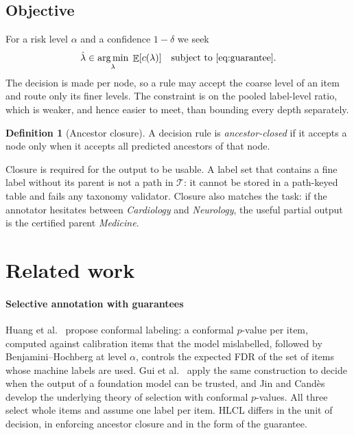 \documentclass[preprint,12pt]{elsarticle}
\theoremstyle{definition}
\newtheorem{definition}{Definition}
\theoremstyle{remark}
\newcommand{\hlcl}{\textup{\textsc{HLCL}}}
\DeclareMathOperator{\E}{\mathbb{E}}
\DeclareMathOperator*{\argmin}{arg\,min}
\begin{document}
\subsection{Objective}

For a risk level $\alpha$ and a confidence $1-\delta$ we seek
\begin{equation}
  \hat\lambda \in \argmin_{\lambda}\; \E[c(\lambda)]
  \quad\text{subject to \eqref{eq:guarantee}.}
  \label{eq:objective}
\end{equation}
The decision is made per node, so a rule may accept the coarse level of an item
and route only its finer levels. The constraint is on the pooled label-level
ratio, which is weaker, and hence easier to meet, than bounding every depth
separately.

\begin{definition}[Ancestor closure]
\label{def:closure}
A decision rule is \emph{ancestor-closed} if it accepts a node only when it
accepts all predicted ancestors of that node.
\end{definition}

Closure is required for the output to be usable. A label set that contains a
fine label without its parent is not a path in $\mathcal{T}$: it cannot be
stored in a path-keyed table and fails any taxonomy validator. Closure also
matches the task: if the annotator hesitates between \emph{Cardiology} and
\emph{Neurology}, the useful partial output is the certified parent
\emph{Medicine}.

\section{Related work}
\label{sec:related}

\paragraph{Selective annotation with guarantees}
Huang et al.~\cite{huang2025selective} propose conformal labeling: a conformal
$p$-value per item, computed against calibration items that the model
mislabelled, followed by Benjamini--Hochberg at level $\alpha$, controls the
expected FDR of the set of items whose machine labels are used. Gui et
al.~\cite{gui2024conformalalignment} apply the same construction to decide when
the output of a foundation model can be trusted, and Jin and
Cand\`es~\cite{jin2023selection} develop the underlying theory of selection with
conformal $p$-values. All three select whole items and assume one label per
item. \hlcl{} differs in the unit of decision, in enforcing ancestor closure and
in the form of the guarantee.
\end{document}
